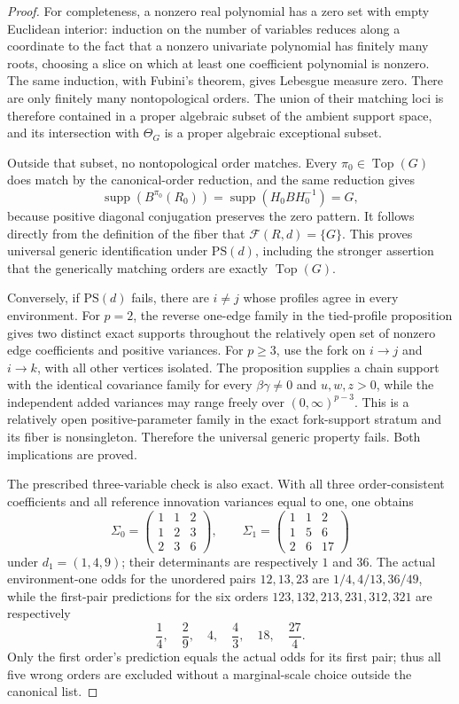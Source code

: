 \documentclass{article}
\begin{document}
\begin{proof}
For completeness, a nonzero real polynomial has a zero set with empty Euclidean interior: induction on the number of variables reduces along a coordinate to the fact that a nonzero univariate polynomial has finitely many roots, choosing a slice on which at least one coefficient polynomial is nonzero.  The same induction, with Fubini's theorem, gives Lebesgue measure zero.  There are only finitely many nontopological orders.  The union of their matching loci is therefore contained in a proper algebraic subset of the ambient support space, and its intersection with \(\Theta_G\) is a proper algebraic exceptional subset.

Outside that subset, no nontopological order matches.  Every \(\pi_0\in\operatorname{Top}(G)\) does match by the canonical-order reduction, and the same reduction gives
\[
 \operatorname{supp}(B^{\pi_0}(R_0))
 =\operatorname{supp}(H_0BH_0^{-1})=G,
\]
because positive diagonal conjugation preserves the zero pattern.  It follows directly from the definition of the fiber that \(\mathcal F(R,d)=\{G\}\).  This proves universal generic identification under \(\mathrm{PS}(d)\), including the stronger assertion that the generically matching orders are exactly \(\operatorname{Top}(G)\).

Conversely, if \(\mathrm{PS}(d)\) fails, there are \(i\ne j\) whose profiles agree in every environment.  For \(p=2\), the reverse one-edge family in the tied-profile proposition gives two distinct exact supports throughout the relatively open set of nonzero edge coefficients and positive variances.  For \(p\ge3\), use the fork on \(i\to j\) and \(i\to k\), with all other vertices isolated.  The proposition supplies a chain support with the identical covariance family for every \(\beta\gamma\ne0\) and \(u,w,z>0\), while the independent added variances may range freely over \((0,\infty)^{p-3}\).  This is a relatively open positive-parameter family in the exact fork-support stratum and its fiber is nonsingleton.  Therefore the universal generic property fails.  Both implications are proved.

The prescribed three-variable check is also exact.  With all three order-consistent coefficients and all reference innovation variances equal to one, one obtains
\[
 \Sigma_0=\begin{pmatrix}1&1&2\\1&2&3\\2&3&6\end{pmatrix},
 \qquad
 \Sigma_1=\begin{pmatrix}1&1&2\\1&5&6\\2&6&17\end{pmatrix}
\]
under \(d_1=(1,4,9)\); their determinants are respectively \(1\) and \(36\).  The actual environment-one odds for the unordered pairs \(12,13,23\) are \(1/4,4/13,36/49\), while the first-pair predictions for the six orders \(123,132,213,231,312,321\) are respectively
\[
 \frac14,\quad\frac29,\quad4,\quad\frac43,\quad18,\quad\frac{27}{4}.
\]
Only the first order's prediction equals the actual odds for its first pair; thus all five wrong orders are excluded without a marginal-scale choice outside the canonical list.
\end{proof}
\end{document}
